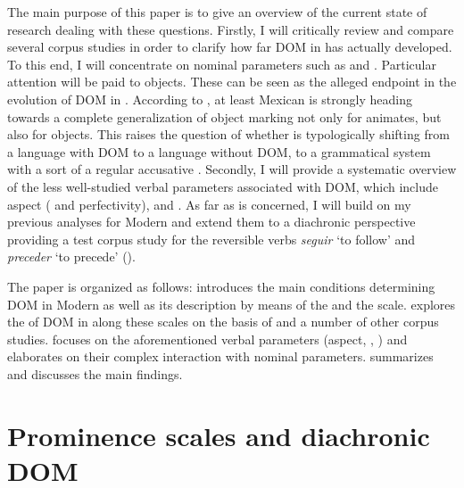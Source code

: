 \documentclass[output=paper]{LSP/langsci}
\begin{document}
The main purpose of this paper is to give an overview of the current state of research dealing with these questions. Firstly, I will critically review and compare several corpus studies in order to clarify how far DOM in  has actually developed. To this end, I will concentrate on nominal parameters such as  and . Particular attention will be paid to  objects. These can be seen as the alleged endpoint in the evolution of DOM in . According to \citet[147]{Company2002Avance}, at least Mexican  is strongly heading towards a complete generalization of object marking not only for animates, but also for  objects. This raises the question of whether  is typologically shifting from a language with DOM to a language without DOM, \ie to a grammatical system with a sort of a regular accusative . Secondly, I will provide a systematic overview of the less well-studied verbal parameters associated with DOM, which include aspect ( and perfectivity),  and . As far as  is concerned, I will build on my previous analyses for Modern  \citep{GarciaGarcia2014Objektmarkierung} and extend them to a diachronic perspective providing a test corpus study for the reversible verbs \textit{seguir} ‘to follow’ and \textit{preceder} ‘to precede’ (\cf {}).

The paper is organized as follows:  introduces the main conditions determining DOM in Modern  as well as its description by means of the  and the  scale.  explores the  of DOM in  along these scales on the basis of \citet{Laca2006Objeto} and a number of other corpus studies.  focuses on the aforementioned verbal parameters (aspect, , ) and elaborates on their complex interaction with nominal parameters.  summarizes and discusses the main findings.

\section{Prominence scales and diachronic DOM} \label{08-ga-sec:2}
\end{document}
